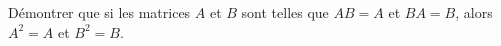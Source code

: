 \begin{exercice}\label{exoLineraire0009}

Démontrer que si les matrices $A$ et $B$ sont telles que $AB=A$ et $BA=B$, alors $A^2=A$ et $B^2=B$.

\end{exercice}
